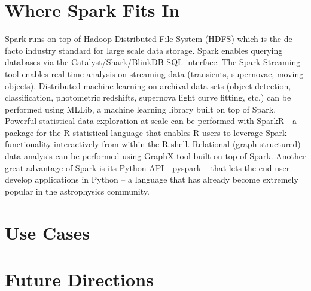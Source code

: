 \documentclass{tufte-handout}
\begin{document}
\section{Where Spark Fits In}
Spark runs on top of Hadoop Distributed File System (HDFS) which is the de-facto industry standard for large scale data storage.  Spark enables querying databases via the Catalyst/Shark/BlinkDB SQL interface. The Spark Streaming tool enables real time analysis on streaming data (transients, supernovae, moving objects). Distributed machine learning  on archival  data sets (object detection, classification, photometric redshifts, supernova light curve fitting, etc.) can be performed using  MLLib,  a machine learning library built on top of Spark. Powerful statistical data exploration at scale can be performed with SparkR - a package for the R statistical language that enables R-users to leverage Spark functionality interactively from within the R shell. Relational (graph structured) data analysis can be performed using GraphX tool built on top of Spark.  Another great advantage of Spark is its Python API - pyspark -- that lets the end user develop applications in Python  -- a language that has already become extremely popular in  the astrophysics community. 



\section{Use Cases} 
\section{Future Directions}
\end{document}
